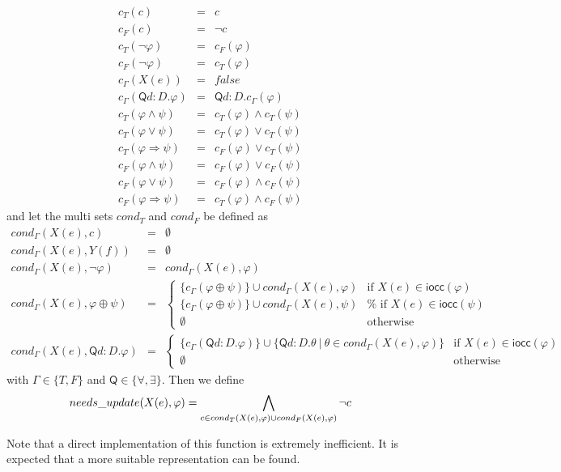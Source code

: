 \begin{equation*}
\begin{array}{lll}
c_{T}(c) & = & c \\
c_{F}(c) & = & \lnot c \\
c_{T}(\lnot \varphi ) & = & c_{F}(\varphi ) \\
c_{F}(\lnot \varphi ) & = & c_{T}(\varphi ) \\
c_{\Gamma }(X(e)) & = & false \\
c_{\Gamma }(\mathsf{Q}d:{D}.\varphi ) & = & \mathsf{Q}d:{D}.c_{\Gamma
}(\varphi ) \\
c_{T}(\varphi \wedge \psi ) & = & c_{T}(\varphi )\wedge c_{T}(\psi ) \\
c_{T}(\varphi \vee \psi ) & = & c_{T}(\varphi )\vee c_{T}(\psi ) \\
c_{T}(\varphi \Rightarrow \psi ) & = & c_{F}(\varphi )\vee c_{T}(\psi ) \\
c_{F}(\varphi \wedge \psi ) & = & c_{F}(\varphi )\vee c_{F}(\psi ) \\
c_{F}(\varphi \vee \psi ) & = & c_{F}(\varphi )\wedge c_{F}(\psi ) \\
c_{F}(\varphi \Rightarrow \psi ) & = & c_{T}(\varphi )\wedge c_{F}(\psi )%
\end{array}%
\end{equation*}%
and let the multi sets $cond_{T}$ and $cond_{F}$ be defined as%
\begin{equation*}
\begin{array}{lll}
cond_{\Gamma }(X(e),c) & = & \emptyset \\
cond_{\Gamma }(X(e),Y(f)) & = & \emptyset \\
cond_{\Gamma }(X(e),\lnot \varphi ) & = & cond_{\Gamma }(X(e),\varphi ) \\
cond_{\Gamma }(X(e),\varphi \oplus \psi ) & = & \left\{
\begin{array}{cc}
\{c_{\Gamma }(\varphi \oplus \psi )\}\cup cond_{\Gamma }(X(e),\varphi ) &
\text{if }X(e)\in \mathsf{iocc}(\varphi ) \\
\{c_{\Gamma }(\varphi \oplus \psi )\}\cup cond_{\Gamma }(X(e),\psi ) & \text{%
if }X(e)\in \mathsf{iocc}(\psi ) \\
\emptyset & \text{otherwise}%
\end{array}%
\right. \\
cond_{\Gamma}(X(e),\mathsf{Q}d:{D}.\varphi ) & = & \left\{
\begin{array}{cc}
\{c_{\Gamma}(\mathsf{Q}d:{D}.\varphi )\}\cup \{\mathsf{Q}d:{D}.\theta \ |\
\theta \in cond_{\Gamma }(X(e),\varphi )\} & \text{if }X(e)\in \mathsf{iocc}%
(\varphi ) \\
\emptyset & \text{otherwise}%
\end{array}%
\right.
\end{array}%
\end{equation*}%
with $\Gamma \in \{T,F\}$ and $\mathsf{Q} \in \{\forall, \exists\}$. Then we
define%
\begin{equation*}
needs\_update(X(e),\varphi )=\dbigwedge\limits_{c\in cond_{T}(X(e),\varphi
)\cup cond_{F}(X(e),\varphi )}\lnot c
\end{equation*}

\begin{remark}
Note that a direct implementation of this function is extremely inefficient.
It is expected that a more suitable representation can be found.\newpage
\end{remark}
